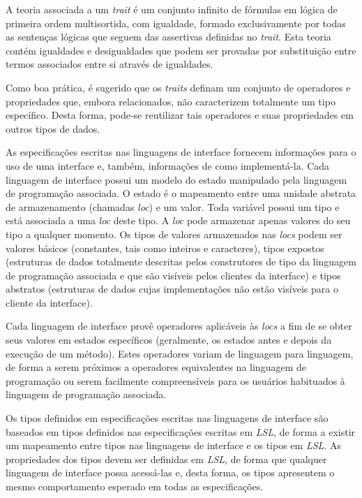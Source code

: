 A teoria associada a um \textit{trait} é um conjunto infinito de fórmulas em lógica de primeira ordem multisortida, com igualdade, formado exclusivamente por todas as sentenças lógicas que seguem das assertivas definidas no \textit{trait}.
Esta teoria contém igualdades e desigualdades que podem ser provadas por substituição entre termos associados entre si através de igualdades.

Como boa prática, é sugerido que os \textit{traits} definam um conjunto de operadores e propriedades que, embora relacionados, não caracterizem totalmente um tipo específico.
Desta forma, pode-se reutilizar tais operadores e suas propriedades em outros tipos de dados.

As especificações escritas nas linguagens de interface fornecem informações para o uso de uma interface e, também, informações de como implementá-la.
Cada linguagem de interface possui um modelo do estado manipulado pela linguagem de programação associada.
O estado é o mapeamento entre uma unidade abstrata de armazenamento (chamadas \textit{loc}) e um valor.
Toda variável possui um tipo e está associada a uma \textit{loc} deste tipo.
A \textit{loc} pode armazenar apenas valores do seu tipo a qualquer momento.
Os tipos de valores armazenados nas \textit{locs} podem ser valores básicos (constantes, tais como inteiros e caracteres), tipos expostos (estruturas de dados totalmente descritas pelos construtores de tipo da linguagem de programação associada e que são visíveis pelos clientes da interface) e tipos abstratos (estruturas de dados cujas implementações não estão visíveis para o cliente da interface).

Cada linguagem de interface provê operadores aplicáveis às \textit{locs} a fim de se obter seus valores em estados específicos (geralmente, os estados antes e depois da execução de um método).
Estes operadores variam de linguagem para linguagem, de forma a serem próximos a operadores equivalentes na linguagem de programação ou serem facilmente compreensíveis para os usuários habituados à linguagem de programação associada.

Os tipos definidos em especificações escritas nas linguagens de interface são baseados em tipos definidos nas especificações escritas em \textit{LSL}, de forma a existir um mapeamento entre tipos nas linguagens de interface e os tipos em \textit{LSL}.
As propriedades dos tipos devem ser definidas em \textit{LSL}, de forma que qualquer linguagem de interface possa acessá-las e, desta forma, os tipos apresentem o mesmo comportamento esperado em todas as especificações.

